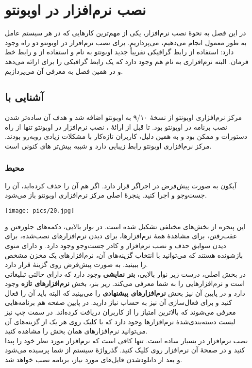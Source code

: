 \chapter{نصب نرم‌افزار در اوبونتو}
در این فصل به نحوهٔ نصب نرم‌افزار، یکی از مهم‌ترین کارهایی که در هر سیستم عامل به طور معمول انجام می‌دهیم، می‌پردازیم. برای نصب نرم‌افزار در اوبونتو دو راه وجود دارد: استفاده از رابط گرافیکی تقریباً جدید اوبونتو به نام  و استفاده از  و رابط خط فرمان. البته نرم‌افزاری به نام  هم وجود دارد که یک رابط گرافیکی را برای  ارائه می‌دهد و در همین فصل به معرفی آن می‌پردازیم.

\section[آشنایی با Center Software Ubuntu]{آشنایی با }
مرکز نرم‌افزاری اوبونتو از نسخهٔ ۹/۱۰ به اوبونتو اضافه شد و هدف آن ساده‌تر شدن نصب برنامه در اوبونتو بود. تا قبل از ارائهٔ ، نصب نرم‌افزار در اوبونتو تنها از راه دستورات  و  ممکن بود و به همین دلیل، کاربران تازه‌کار با مشکلات زیادی روبه‌رو بودند. مرکز نرم‌افزاری اوبونتو رابط زیبایی دارد و شبیه بیش‌تر های کنونی است.

\subsection[محیط Center Software Ubuntu]{محیط }
آیکون  به صورت پیش‌فرض در اجراگر قرار دارد. اگر هم آن را حذف کرده‌اید، آن را جست‌وجو و اجرا کنید. پنجرهٔ اصلی مرکز نرم‌افزاری اوبونتو باز می‌شود.

\begin{center}
\texttt{[image: pics/20.jpg]}
\end{center}

این پنجره از بخش‌های مختلفی تشکیل شده است. در نوار بالایی، دکمه‌های جلورفتن و عقب‌رفتن،  برای مشاهدهٔ همهٔ نرم‌افزارها،  برای دیدن نرم‌افزارهای نصب‌شده،  برای دیدن سوابق حذف و نصب نرم‌افزار و کادر جست‌وجو وجود دارد.  و  دارای منوی بازشونده هستند که می‌توانید با انتخاب گزینه‌های آن، نرم‌افزارهای یک مخزن مشخص را ببینید.  به صورت پیش‌فرض روی گزینهٔ  قرار دارد.\\
در بخش اصلی، درست زیر نوار بالایی، \textbf{بنر نمایشی} وجود دارد که دارای حالتی تبلیغاتی است و نرم‌افزارهایی را به شما معرفی می‌کند. زیر بنر، بخش \textbf{نرم‌افزارهای تازه} وجود دارد و در پایین آن نیز بخش \textbf{نرم‌افزارهای پیشنهادی} را می‌بینید که البته باید آن را فعال کنید و برای فعال‌سازی آن نیز به حساب  نیاز دارید. در پایین صفحه هم برنامه‌هایی معرفی می‌شوند که بالاترین امتیاز را از کاربران دریافت کرده‌اند. در سمت چپ نیز لیست دسته‌بندی‌شدهٔ نرم‌افزارها وجود دارد که با کلیک روی هر یک از گزینه‌های آن می‌توانید نرم‌افزارهای همان بخش را مشاهده کنید.\\
نصب نرم‌افزار در  بسیار ساده است. تنها کافی است که نرم‌افزار مورد نظر خود را پیدا کنید و در صفحهٔ آن نرم‌افزار روی  کلیک کنید. گذرواژهٔ سیستم از شما پرسیده می‌شود و بعد از دانلودشدن فایل‌های مورد نیاز، برنامه نصب خواهد شد.

